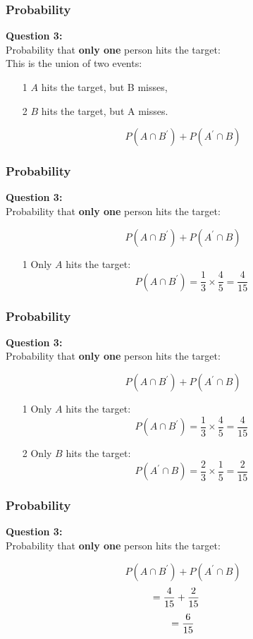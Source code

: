 \documentclass{beamer}
\begin{document}
\begin{frame}
\Large{
\frametitle{Probability}
\textbf{Question 3:}\\
Probability that \textbf{only one} person hits the target:
\\ \bigskip
This is the union of two events:
\begin{itemize}
\item[ 1]  $A$ hits the target, but B misses,
\item[ 2]  $B$ hits the target, but A misses.
\end{itemize}

\bigskip
\[P(A \cap B^{\prime})+ P(A^{\prime} \cap B)\]
}
\end{frame}


\begin{frame}
\Large{
\frametitle{Probability}
\textbf{Question 3:}\\
Probability that \textbf{only one} person hits the target:

\[P(A \cap B^{\prime})+ P(A^{\prime} \cap B)\]
\begin{itemize}
\item[1] Only $A$ hits the target: \[P(A \cap B^{\prime}) = \frac{1}{3} \times \frac{4}{5} = \frac{4}{15} \]
\end{itemize}
}
\end{frame}
\begin{frame}
\Large{
\frametitle{Probability}
\textbf{Question 3:}\\
Probability that \textbf{only one} person hits the target:

\[P(A \cap B^{\prime})+ P(A^{\prime} \cap B)\]
\begin{itemize}
\item[1] Only $A$ hits the target: \[P(A \cap B^{\prime}) = \frac{1}{3} \times \frac{4}{5} = \frac{4}{15} \]
\item[2] Only $B$ hits the target:  \[P(A^{\prime} \cap B) = \frac{2}{3} \times \frac{1}{5} = \frac{2}{15} \]
\end{itemize}
}
\end{frame}
\begin{frame}
\Large{
\frametitle{Probability}
\textbf{Question 3:}\\
Probability that \textbf{only one} person hits the target:

\[P(A \cap B^{\prime})+ P(A^{\prime} \cap B)\]
\[=\frac{4}{15}+ \frac{2}{15}  \hspace{0.5cm}\]\[= {\Huge \frac{6}{15}}\]

}
\end{frame}
\end{document}
